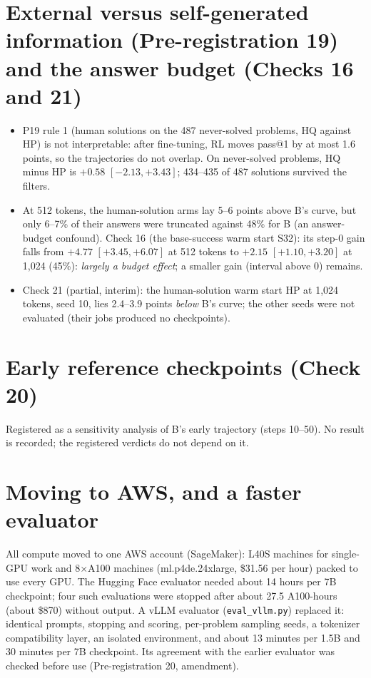\documentclass[11pt]{article}
\begin{document}
\section{External versus self-generated information (Pre-registration 19) and the answer budget (Checks 16 and 21)}
\begin{found}
\begin{itemize}[leftmargin=*,itemsep=1pt]
\item P19 rule 1 (human solutions on the 487 never-solved problems, HQ against HP) is not interpretable: after fine-tuning, RL moves pass@1 by at most 1.6 points, so the trajectories do not overlap. On never-solved problems, HQ minus HP is $+0.58$ $[-2.13,+3.43]$; 434--435 of 487 solutions survived the filters.
\item At 512 tokens, the human-solution arms lay 5--6 points above B's curve, but only 6--7\% of their answers were truncated against 48\% for B (an answer-budget confound). Check 16 (the base-success warm start S32): its step-0 gain falls from $+4.77$ $[+3.45,+6.07]$ at 512 tokens to $+2.15$ $[+1.10,+3.20]$ at 1,024 (45\%): \emph{largely a budget effect}; a smaller gain (interval above 0) remains.
\item Check 21 (partial, interim): the human-solution warm start HP at 1,024 tokens, seed 10, lies 2.4--3.9 points \emph{below} B's curve; the other seeds were not evaluated (their jobs produced no checkpoints).
\end{itemize}
\end{found}

\section{Early reference checkpoints (Check 20)}
Registered as a sensitivity analysis of B's early trajectory (steps 10--50). No result is recorded; the registered verdicts do not depend on it.

\section{Moving to AWS, and a faster evaluator}
All compute moved to one AWS account (SageMaker): L40S machines for single-GPU work and 8$\times$A100 machines (ml.p4de.24xlarge, \$31.56 per hour) packed to use every GPU. The Hugging Face evaluator needed about 14 hours per 7B checkpoint; four such evaluations were stopped after about 27.5 A100-hours (about \$870) without output. A vLLM evaluator (\texttt{eval\_vllm.py}) replaced it: identical prompts, stopping and scoring, per-problem sampling seeds, a tokenizer compatibility layer, an isolated environment, and about 13 minutes per 1.5B and 30 minutes per 7B checkpoint. Its agreement with the earlier evaluator was checked before use (Pre-registration 20, amendment).
\end{document}
